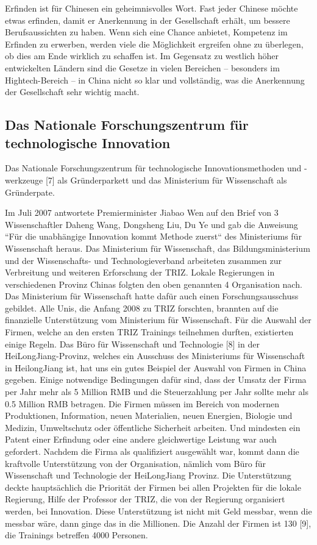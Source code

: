 \documentclass[11pt,a4paper]{article}
\begin{document}
Erfinden ist für Chinesen ein geheimnisvolles Wort. Fast jeder Chinese möchte
etwas erfinden, damit er Anerkennung in der Gesellschaft erhält, um bessere
Berufsaussichten zu haben. Wenn sich eine Chance anbietet, Kompetenz im
Erfinden zu erwerben, werden viele die Möglichkeit ergreifen ohne zu
überlegen, ob dies am Ende wirklich zu schaffen ist. Im Gegensatz zu westlich
höher entwickelten Ländern sind die Gesetze in vielen Bereichen -- besonders
im Hightech-Bereich -- in China nicht so klar und vollständig, was die
Anerkennung der Gesellschaft sehr wichtig macht.

\subsection{Das Nationale Forschungszentrum für technologische Innovation}

Das Nationale Forschungszentrum für technologische Innovationsmethoden und
-werkzeuge [7] als Gründerparkett und das Ministerium für Wissenschaft als
Gründerpate.

Im Juli 2007 antwortete Premierminister Jiabao Wen auf den Brief von 3
Wissenschaftler Daheng Wang, Dongsheng Liu, Du Ye und gab die Anweisung “Für
die unabhängige Innovation kommt Methode zuerst“ des Ministeriums für
Wissenschaft heraus. Das Ministerium für Wissenschaft, das Bildungsministerium
und der Wissenschafts- und Technologieverband arbeiteten zusammen zur
Verbreitung und weiteren Erforschung der TRIZ. Lokale Regierungen in
verschiedenen Provinz Chinas folgten den oben genannten 4 Organisation nach.
Das Ministerium für Wissenschaft hatte dafür auch einen Forschungsausschuss
gebildet. Alle Unis, die Anfang 2008 zu TRIZ forschten, brannten auf die
finanzielle Unterstützung vom Ministerium für Wissenschaft. Für die Auswahl
der Firmen, welche an den ersten TRIZ Trainings teilnehmen durften,
existierten einige Regeln. Das Büro für Wissenschaft und Technologie [8] in
der HeiLongJiang-Provinz, welches ein Ausschuss des Ministeriums für
Wissenschaft in HeilongJiang ist, hat uns ein gutes Beispiel der Auswahl von
Firmen in China gegeben. Einige notwendige Bedingungen dafür sind, dass der
Umsatz der Firma per Jahr mehr als 5 Million RMB und die Steuerzahlung per
Jahr sollte mehr als 0.5 Million RMB betragen. Die Firmen müssen im Bereich
von modernen Produktionen, Information, neuen Materialien, neuen Energien,
Biologie und Medizin, Umweltschutz oder öffentliche Sicherheit arbeiten. Und
mindesten ein Patent einer Erfindung oder eine andere gleichwertige Leistung
war auch gefordert. Nachdem die Firma als qualifiziert ausgewählt war, kommt
dann die kraftvolle Unterstützung von der Organisation, nämlich vom Büro für
Wissenschaft und Technologie der HeiLongJiang Provinz. Die Unterstützung
deckte hauptsächlich die Priorität der Firmen bei allen Projekten für die
lokale Regierung, Hilfe der Professor der TRIZ, die von der Regierung
organisiert werden, bei Innovation. Diese Unterstützung ist nicht mit Geld
messbar, wenn die messbar wäre, dann ginge das in die Millionen. Die Anzahl
der Firmen ist 130 [9], die Trainings betreffen 4000 Personen.
\end{document}
